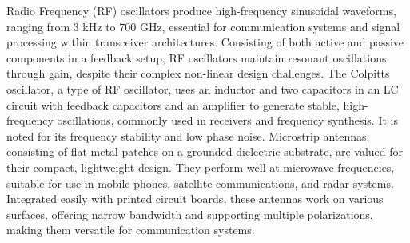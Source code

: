 Radio Frequency (RF) oscillators produce high-frequency sinusoidal waveforms, ranging from 3 kHz to 700 GHz, essential for communication systems and signal processing within transceiver architectures. Consisting of both active and passive components in a feedback setup, RF oscillators maintain resonant oscillations through gain, despite their complex non-linear design challenges. The Colpitts oscillator, a type of RF oscillator, uses an inductor and two capacitors in an LC circuit with feedback capacitors and an amplifier to generate stable, high-frequency oscillations, commonly used in receivers and frequency synthesis. It is noted for its frequency stability and low phase noise. Microstrip antennas, consisting of flat metal patches on a grounded dielectric substrate, are valued for their compact, lightweight design. They perform well at microwave frequencies, suitable for use in mobile phones, satellite communications, and radar systems. Integrated easily with printed circuit boards, these antennas work on various surfaces, offering narrow bandwidth and supporting multiple polarizations, making them versatile for communication systems.